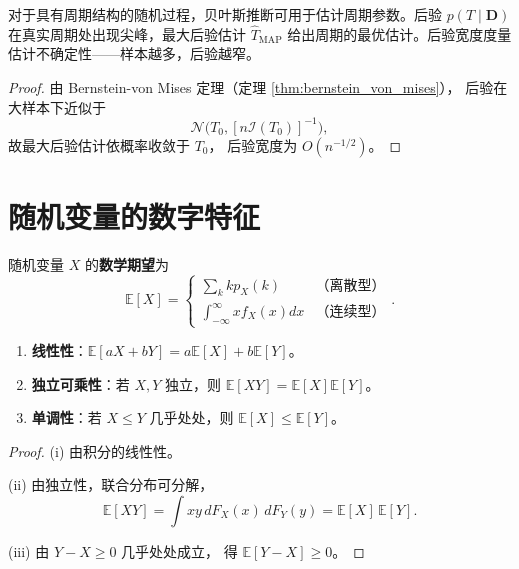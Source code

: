 \begin{proposition}[贝叶斯周期参数估计]\label{prop:bayesian_periodic_diagnosis}
对于具有周期结构的随机过程，贝叶斯推断可用于估计周期参数。后验 $p(T \mid \mathbf{D})$ 在真实周期处出现尖峰，最大后验估计 $\hat{T}_{\text{MAP}}$ 给出周期的最优估计。后验宽度度量估计不确定性——样本越多，后验越窄。
\end{proposition}

\begin{proof}
由 Bernstein-von Mises 定理（定理 \ref{thm:bernstein_von_mises}），
后验在大样本下近似于
\[
\mathcal{N}\!\bigl(T_0, [n\mathcal{I}(T_0)]^{-1}\bigr),
\]
故最大后验估计依概率收敛于 $T_0$，
后验宽度为 $O(n^{-1/2})$。
\end{proof}

\section{随机变量的数字特征}\label{sec:numerical_characteristics}

\begin{definition}[数学期望]\label{def:mathematical_expectation}
随机变量 $X$ 的\textbf{数学期望}为
\[
\mathbb{E}[X] =
\begin{cases}
\sum_k k p_X(k) & \text{（离散型）} \\
\int_{-\infty}^{\infty} x f_X(x) dx & \text{（连续型）}
\end{cases}.
\]
\end{definition}

\begin{property}[期望的基本性质]\label{prop:expectation_properties}
\begin{enumerate}[label=(\roman*)]
    \item \textbf{线性性}：$\mathbb{E}[aX + bY] = a\mathbb{E}[X] + b\mathbb{E}[Y]$。
    \item \textbf{独立可乘性}：若 $X, Y$ 独立，则 $\mathbb{E}[XY] = \mathbb{E}[X]\mathbb{E}[Y]$。
    \item \textbf{单调性}：若 $X \le Y$ 几乎处处，则 $\mathbb{E}[X] \le \mathbb{E}[Y]$。
\end{enumerate}
\end{property}

\begin{proof}
(i) 由积分的线性性。

(ii) 由独立性，联合分布可分解，
\[
\mathbb{E}[XY]
= \int xy \, dF_X(x)\,dF_Y(y)
= \mathbb{E}[X]\,\mathbb{E}[Y].
\]

(iii) 由 $Y - X \ge 0$ 几乎处处成立，
得 $\mathbb{E}[Y - X] \ge 0$。
\end{proof}

